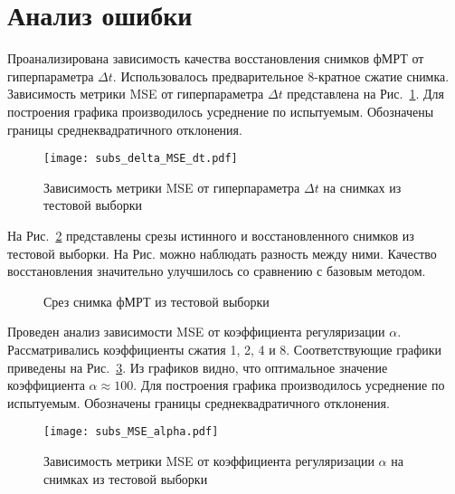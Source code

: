 \documentclass[a4paper, 12pt]{article}
\begin{document}
\section{Анализ ошибки}

	Проанализирована зависимость качества восстановления снимков фМРТ от гиперпараметра $\Delta t$.
	Использовалось предварительное 8-кратное сжатие снимка.
	Зависимость метрики MSE от гиперпараметра $\Delta t$ представлена на Рис.~\ref{fig:3}.
	Для построения графика производилось усреднение по испытуемым.
	Обозначены границы среднеквадратичного отклонения.
	
	\begin{figure}[h!]
		\centering
		\texttt{[image: subs\_delta\_MSE\_dt.pdf]}
		\caption{Зависимость метрики MSE от гиперпараметра $\Delta t$ на снимках из тестовой выборки}
		\label{fig:3}
	\end{figure}

	На Рис.~\ref*{fig:4} представлены срезы истинного и восстановленного снимков из 
	тестовой выборки. На Рис. можно наблюдать разность между ними.
	Качество восстановления значительно улучшилось со сравнению с базовым методом.

	\begin{figure}[h!]
		\centering
		\hfill
		\hfill
		\caption{Срез снимка фМРТ из тестовой выборки}
		\label{fig:4}
	\end{figure}

	Проведен анализ зависимости MSE от коэффициента регуляризации $\alpha$.
	Рассматривались коэффициенты сжатия 1, 2, 4 и 8. 
	Соответствующие графики приведены на Рис.~\ref{fig:5}.
	Из графиков видно, что оптимальное значение коэффициента $\alpha \approx 100$.
	Для построения графика производилось усреднение по испытуемым.
	Обозначены границы среднеквадратичного отклонения.

	\begin{figure}[h!]
		\centering
		\texttt{[image: subs\_MSE\_alpha.pdf]}
		\caption{Зависимость метрики MSE от коэффициента регуляризации $\alpha$ на снимках из тестовой выборки}
		\label{fig:5}
	\end{figure}
\end{document}
